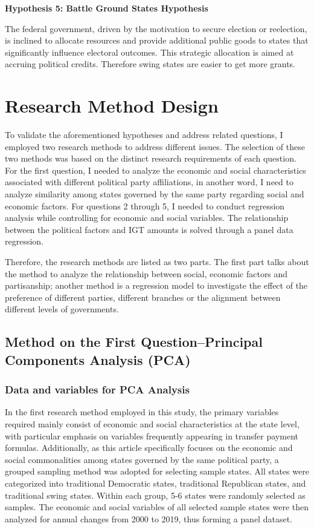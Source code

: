 \textbf{Hypothesis 5: Battle Ground States Hypothesis}

The federal government, driven by the motivation to secure election or reelection, is inclined to allocate resources and provide additional public goods to states that significantly influence electoral outcomes. This strategic allocation is aimed at accruing political credits. Therefore swing states are easier to get more grants.

\section{Research Method Design}


To validate the aforementioned hypotheses and address related questions, I employed two research methods to address different issues. The selection of these two methods was based on the distinct research requirements of each question. For the first question, I needed to analyze the economic and social characteristics associated with different political party affiliations, in another word, I need to analyze similarity among states governed by the same party regarding social and economic factors. For questions 2 through 5, I needed to conduct regression analysis while controlling for economic and social variables. The relationship between the political factors and IGT amounts is solved through a panel data regression.

Therefore, the research methods are listed as two parts. The first part talks about the method to analyze the relationship between social, economic factors and partisanship; another method is a regression model to investigate the effect of the preference of different parties, different branches or the alignment between different levels of governments.

\subsection{Method on the First Question--Principal Components Analysis (PCA)}
\subsubsection{Data and variables for PCA Analysis}
In the first research method employed in this study, the primary variables required mainly consist of economic and social characteristics at the state level, with particular emphasis on variables frequently appearing in transfer payment formulas. Additionally, as this article specifically focuses on the economic and social commonalities among states governed by the same political party, a grouped sampling method was adopted for selecting sample states. All states were categorized into traditional Democratic states, traditional Republican states, and traditional swing states. Within each group, 5-6 states were randomly selected as samples. The economic and social variables of all selected sample states were then analyzed for annual changes from 2000 to 2019, thus forming a panel dataset.

